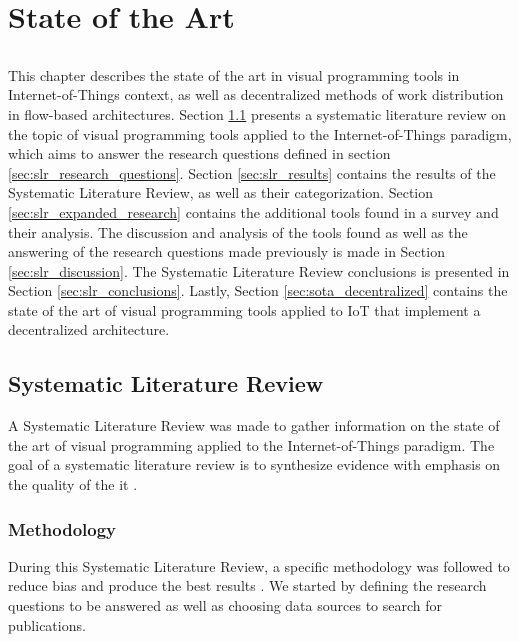 \chapter{State of the Art} \label{chap:sota} \minitoc

\section*{}


This chapter describes the state of the art in visual programming tools in Internet-of-Things context, as well as decentralized methods of work distribution in flow-based architectures. Section \ref{sec:slr} presents a systematic literature review on the topic of visual programming tools applied to the Internet-of-Things paradigm, which aims to answer the research questions defined in section \ref{sec:slr_research_questions}. Section \ref{sec:slr_results} contains the results of the Systematic Literature Review, as well as their categorization. Section \ref{sec:slr_expanded_research} contains the additional tools found in a survey and their analysis. The discussion and analysis of the tools found as well as the answering of the research questions made previously is made in Section \ref{sec:slr_discussion}. The Systematic Literature Review conclusions is presented in Section \ref{sec:slr_conclusions}. Lastly, Section \ref{sec:sota_decentralized} contains the state of the art of visual programming tools applied to IoT that implement a decentralized architecture.

\section{Systematic Literature Review}\label{sec:slr}

A Systematic Literature Review was made to gather information on the state of the art of visual programming applied to the Internet-of-Things paradigm. The goal of a systematic literature review is to synthesize evidence with emphasis on the quality of the it \cite{SLR_guidelines}.

\subsection{Methodology}\label{sec:methodology}

During this Systematic Literature Review, a specific methodology was followed to reduce bias and produce the best results \cite{SLR_guidelines}.
We started by defining the research questions to be answered as well as choosing data sources to search for publications.

